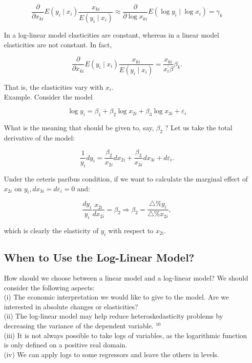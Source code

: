 $$
\frac{\partial}{\partial x_{k i}} E\left(y_{i} \mid x_{i}\right) \frac{x_{k i}}{E\left(y_{i} \mid x_{i}\right)} \approx \frac{\partial}{\partial \log x_{k i}} E\left(\log y_{i} \mid \log x_{i}\right)=\gamma_{k}
$$

In a log-linear model elasticities are constant, whereas in a linear model elasticities are not constant. In fact,

$$
\frac{\partial}{\partial x_{k i}} E\left(y_{i} \mid x_{i}\right) \frac{x_{k i}}{E\left(y_{i} \mid x_{i}\right)}=\frac{x_{k i}}{x_{i}^{\prime} \beta} \beta_{k} .
$$

That is, the elasticities vary with $x_{i}$.\\
Example. Consider the model

$$
\log y_{i}=\beta_{1}+\beta_{2} \log x_{2 i}+\beta_{3} \log x_{3 i}+\varepsilon_{i}
$$

What is the meaning that should be given to, say, $\beta_{2}$ ? Let us take the total derivative of the model:

$$
\frac{1}{y_{i}} d y_{i}=\frac{\beta_{2}}{x_{2 i}} d x_{2 i}+\frac{\beta_{3}}{x_{3 i}} d x_{3 i}+d \varepsilon_{i} .
$$

Under the ceteris paribus condition, if we want to calculate the marginal effect of $x_{2 i}$ on $y_{i}, d x_{3 i}=d \varepsilon_{i}=0$ and:

$$
\frac{d y_{i}}{y_{i}} \frac{x_{2 i}}{d x_{2 i}}=\beta_{2} \Longrightarrow \beta_{2}=\frac{\triangle \% y_{i}}{\triangle \% x_{2 i}},
$$

which is clearly the elasticity of $y_{i}$ with respect to $x_{2 i}$.

\subsection{When to Use the Log-Linear Model?}
How should we choose between a linear model and a log-linear model? We should consider the following aspects:\\
(i) The economic interpretation we would like to give to the model. Are we interested in absolute changes or elasticities?\\
(ii) The log-linear model may help reduce heteroskedasticity problems by decreasing the variance of the dependent variable. ${ }^{10}$\\
(iii) It is not always possible to take logs of variables, as the logarithmic function is only defined on a positive real domain.\\
(iv) We can apply logs to some regressors and leave the others in levels.

